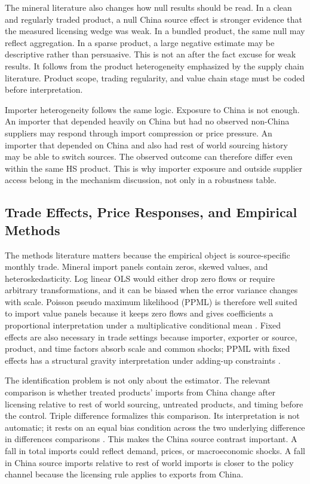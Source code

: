 \documentclass[12pt,a4paper]{article}
\numberwithin{equation}{section}
\begin{document}
The mineral literature also changes how null results should be read. In a clean and regularly traded product, a null China source effect is stronger evidence that the measured licensing wedge was weak. In a bundled product, the same null may reflect aggregation. In a sparse product, a large negative estimate may be descriptive rather than persuasive. This is not an after the fact excuse for weak results. It follows from the product heterogeneity emphasized by the supply chain literature. Product scope, trading regularity, and value chain stage must be coded before interpretation.

Importer heterogeneity follows the same logic. Exposure to China is not enough. An importer that depended heavily on China but had no observed non-China suppliers may respond through import compression or price pressure. An importer that depended on China and also had rest of world sourcing history may be able to switch sources. The observed outcome can therefore differ even within the same HS product. This is why importer exposure and outside supplier access belong in the mechanism discussion, not only in a robustness table.

\subsection{Trade Effects, Price Responses, and Empirical Methods}

The methods literature matters because the empirical object is source-specific monthly trade. Mineral import panels contain zeros, skewed values, and heteroskedasticity. Log linear OLS would either drop zero flows or require arbitrary transformations, and it can be biased when the error variance changes with scale. Poisson pseudo maximum likelihood (PPML) is therefore well suited to import value panels because it keeps zero flows and gives coefficients a proportional interpretation under a multiplicative conditional mean \citep{santossilva2006gravity}. Fixed effects are also necessary in trade settings because importer, exporter or source, product, and time factors absorb scale and common shocks; PPML with fixed effects has a structural gravity interpretation under adding-up constraints \citep{fally2015_structural_gravity_fe}.

The identification problem is not only about the estimator. The relevant comparison is whether treated products' imports from China change after licensing relative to rest of world sourcing, untreated products, and timing before the control. Triple difference formalizes this comparison. Its interpretation is not automatic; it rests on an equal bias condition across the two underlying difference in differences comparisons \citep{olden_moen2022_triple_difference}. This makes the China source contrast important. A fall in total imports could reflect demand, prices, or macroeconomic shocks. A fall in China source imports relative to rest of world imports is closer to the policy channel because the licensing rule applies to exports from China.
\end{document}

